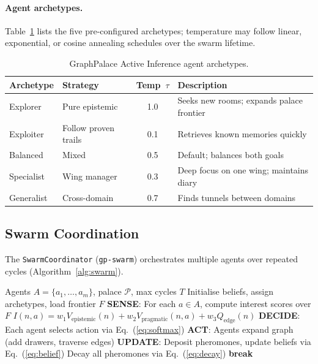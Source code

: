 \documentclass[11pt,a4paper]{article}
\begin{document}
\paragraph{Agent archetypes.}
Table~\ref{tab:archetypes} lists the five pre-configured archetypes; temperature
may follow linear, exponential, or cosine annealing schedules over the swarm
lifetime.

\begin{table}[ht]
\centering
\caption{GraphPalace Active Inference agent archetypes.}
\label{tab:archetypes}
\begin{tabular}{llcp{5.5cm}}
\toprule
\textbf{Archetype} & \textbf{Strategy} & \textbf{Temp~$\tau$} & \textbf{Description} \\
\midrule
Explorer   & Pure epistemic     & 1.0 & Seeks new rooms; expands palace frontier \\
Exploiter  & Follow proven trails & 0.1 & Retrieves known memories quickly \\
Balanced   & Mixed              & 0.5 & Default; balances both goals \\
Specialist & Wing manager       & 0.3 & Deep focus on one wing; maintains diary \\
Generalist & Cross-domain       & 0.7 & Finds tunnels between domains \\
\bottomrule
\end{tabular}
\end{table}

\subsection{Swarm Coordination}
\label{sec:swarm}

The \texttt{SwarmCoordinator} (\texttt{gp-swarm}) orchestrates multiple agents
over repeated cycles (Algorithm~\ref{alg:swarm}).

\begin{algorithm}[ht]
\caption{GraphPalace Swarm Coordination Cycle}
\label{alg:swarm}
\begin{algorithmic}[1]
\Require Agents $A = \{a_1,\ldots,a_m\}$, palace $\mathcal{P}$, max cycles $T$
\State Initialise beliefs, assign archetypes, load frontier $F$
    \State \textbf{SENSE}: For each $a \in A$, compute interest scores over $F$
    \Statex \quad\quad\quad\quad $I(n, a) = w_1 V_{\text{epistemic}}(n) + w_2 V_{\text{pragmatic}}(n,a) + w_3 Q_{\text{edge}}(n)$
    \State \textbf{DECIDE}: Each agent selects action via Eq.~(\ref{eq:softmax})
    \State \textbf{ACT}: Agents expand graph (add drawers, traverse edges)
    \State \textbf{UPDATE}: Deposit pheromones, update beliefs via Eq.~(\ref{eq:belief})
      Decay all pheromones via Eq.~(\ref{eq:decay}) \EndIf
      \textbf{break} \EndIf
\EndFor
\end{algorithmic}
\end{algorithm}
\end{document}
